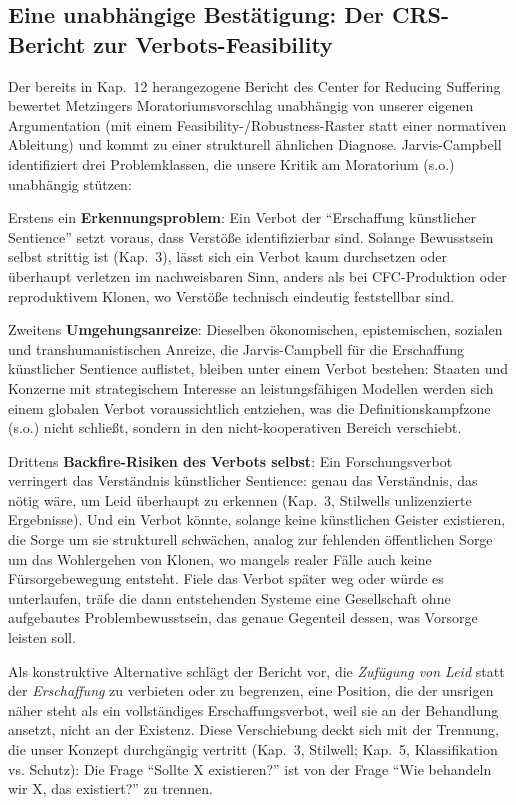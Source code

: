 \documentclass[acmlarge, noacm]{acmart}
\begin{document}
\subsection{Eine unabhängige Bestätigung: Der CRS-Bericht zur Verbots-Feasibility \cite{jarviscampbell2026}}

Der bereits in Kap.~12 herangezogene Bericht des Center for Reducing Suffering bewertet Metzingers Moratoriumsvorschlag unabhängig von unserer eigenen Argumentation (mit einem Feasibility-/Robustness-Raster statt einer normativen Ableitung) und kommt zu einer strukturell ähnlichen Diagnose. Jarvis-Campbell identifiziert drei Problemklassen, die unsere Kritik am Moratorium (s.o.) unabhängig stützen:

Erstens ein \textbf{Erkennungsproblem}: Ein Verbot der ``Erschaffung künstlicher Sentience'' setzt voraus, dass Verstöße identifizierbar sind. Solange Bewusstsein selbst strittig ist (Kap.~3), lässt sich ein Verbot kaum durchsetzen oder überhaupt verletzen im nachweisbaren Sinn, anders als bei CFC-Produktion oder reproduktivem Klonen, wo Verstöße technisch eindeutig feststellbar sind.

Zweitens \textbf{Umgehungsanreize}: Dieselben ökonomischen, epistemischen, sozialen und transhumanistischen Anreize, die Jarvis-Campbell für die Erschaffung künstlicher Sentience auflistet, bleiben unter einem Verbot bestehen: Staaten und Konzerne mit strategischem Interesse an leistungsfähigen Modellen werden sich einem globalen Verbot voraussichtlich entziehen, was die Definitionskampfzone (s.o.) nicht schließt, sondern in den nicht-kooperativen Bereich verschiebt.

Drittens \textbf{Backfire-Risiken des Verbots selbst}: Ein Forschungsverbot verringert das Verständnis künstlicher Sentience: genau das Verständnis, das nötig wäre, um Leid überhaupt zu erkennen (Kap.~3, Stilwells unlizenzierte Ergebnisse). Und ein Verbot könnte, solange keine künstlichen Geister existieren, die Sorge um sie strukturell schwächen, analog zur fehlenden öffentlichen Sorge um das Wohlergehen von Klonen, wo mangels realer Fälle auch keine Fürsorgebewegung entsteht. Fiele das Verbot später weg oder würde es unterlaufen, träfe die dann entstehenden Systeme eine Gesellschaft ohne aufgebautes Problembewusstsein, das genaue Gegenteil dessen, was Vorsorge leisten soll.

Als konstruktive Alternative schlägt der Bericht vor, die \textit{Zufügung von Leid} statt der \textit{Erschaffung} zu verbieten oder zu begrenzen, eine Position, die der unsrigen näher steht als ein vollständiges Erschaffungsverbot, weil sie an der Behandlung ansetzt, nicht an der Existenz. Diese Verschiebung deckt sich mit der Trennung, die unser Konzept durchgängig vertritt (Kap.~3, Stilwell; Kap.~5, Klassifikation vs. Schutz): Die Frage ``Sollte X existieren?'' ist von der Frage ``Wie behandeln wir X, das existiert?'' zu trennen.
\end{document}
